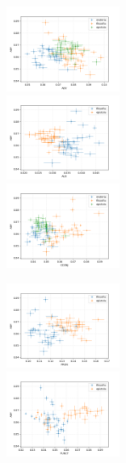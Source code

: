 \documentclass[10pt,a4paper,onecolumn]{article}
\theoremstyle{definition}
\theoremstyle{remark}
\begin{document}
\begin{figure}[htpb!]
	\centering
	\begin{multicols}{3}
		\includegraphics[width=0.33\textwidth]{graficos/ADP_x_ADV.png}  \\
		\includegraphics[width=0.33\textwidth]{graficos/ADP_x_AUX.png}  \\
		\includegraphics[width=0.33\textwidth]{graficos/ADP_x_CCONJ.png}  \\
	\end{multicols}\vspace{-0.8cm}
	\begin{multicols}{3}
		\includegraphics[width=0.33\textwidth]{graficos/ADP_x_PRON.png}  \\
		\includegraphics[width=0.33\textwidth]{graficos/ADP_x_PUNCT.png}  \\

\end{multicols}
\end{figure}
\end{document}
